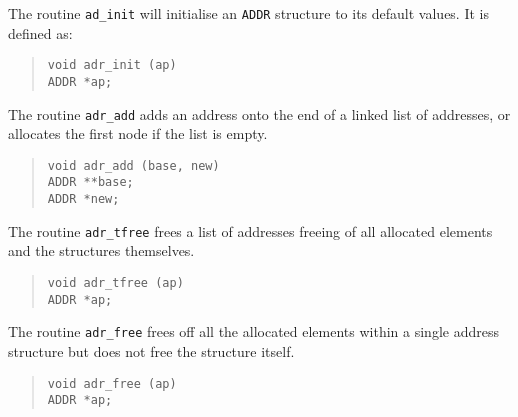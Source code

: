 The routine \verb|ad_init| will initialise an \verb|ADDR| structure to
its default values. It is defined as:
\begin{quote}\small{}\begin{verbatim}
void adr_init (ap)
ADDR *ap;
\end{verbatim}\end{quote}

The routine \verb|adr_add| adds an address onto the end of a linked
list of addresses, or allocates the first node if the list is empty.
\begin{quote}\small{}\begin{verbatim}
void adr_add (base, new)
ADDR **base;
ADDR *new;
\end{verbatim}\end{quote}

The routine \verb|adr_tfree| frees a list of addresses freeing of all
allocated elements and the structures themselves.
\begin{quote}\small{}\begin{verbatim}
void adr_tfree (ap)
ADDR *ap;
\end{verbatim}\end{quote}

The routine \verb|adr_free| frees off all the allocated elements
within a single address structure but does not free the structure
itself.
\begin{quote}\small{}\begin{verbatim}
void adr_free (ap)
ADDR *ap;
\end{verbatim}\end{quote}

\bigskip


